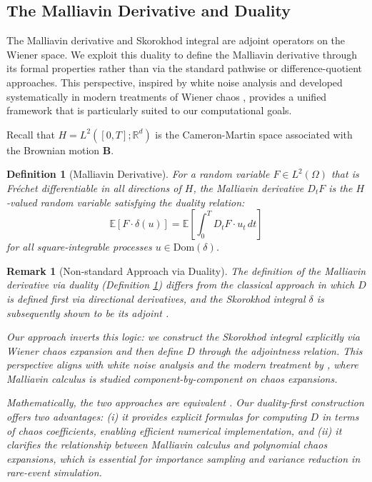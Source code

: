 \documentclass[11pt]{article}
\newtheorem{remark}{Remark}
\newtheorem{definition}{Definition}
\begin{document}
\subsection{The Malliavin Derivative and Duality}\label{sec:Malliavin_duality}

The Malliavin derivative and Skorokhod integral are adjoint operators on the Wiener space. We exploit this duality to define the Malliavin derivative through its formal properties rather than via the standard pathwise or difference-quotient approaches. This perspective, inspired by white noise analysis \citep{hida1967analysis} and developed systematically in modern treatments of Wiener chaos \citep{huang2012introduction}, provides a unified framework that is particularly suited to our computational goals.

Recall that $H = L^2([0,T]; \mathbb{R}^d)$ is the Cameron-Martin space associated with the Brownian motion $\mathbf{B}$.

\begin{definition}[Malliavin Derivative]\label{def:malliavin}
For a random variable $F \in L^2(\Omega)$ that is Fréchet differentiable in all directions of $H$, the Malliavin derivative $D_t F$ is the $H$-valued random variable satisfying the duality relation:
\begin{equation}
\mathbb{E}[F \cdot \delta(u)] = \mathbb{E}\left[\int_0^T D_t F \cdot u_t \, dt\right]
\label{eq:malliavin_def}
\end{equation}
for all square-integrable processes $u \in \text{Dom}(\delta)$.
\end{definition}

\begin{remark}[Non-standard Approach via Duality]\label{rem:non_standard}
The definition of the Malliavin derivative via duality (Definition \ref{def:malliavin}) differs from the classical approach in which $D$ is defined first via directional derivatives, and the Skorokhod integral $\delta$ is subsequently shown to be its adjoint \citep{nualart2006malliavin, nualart1988stochastic}. 

Our approach inverts this logic: we construct the Skorokhod integral explicitly via Wiener chaos expansion and then define $D$ through the adjointness relation. This perspective aligns with white noise analysis \citep{hida1967analysis} and the modern treatment by \citep{peccati2011wiener}, where Malliavin calculus is studied component-by-component on chaos expansions. 

Mathematically, the two approaches are equivalent \citep{ustunel2013transformation}. Our duality-first construction offers two advantages: (i) it provides explicit formulas for computing $D$ in terms of chaos coefficients, enabling efficient numerical implementation, and (ii) it clarifies the relationship between Malliavin calculus and polynomial chaos expansions, which is essential for importance sampling and variance reduction in rare-event simulation.
\end{remark}
\end{document}
